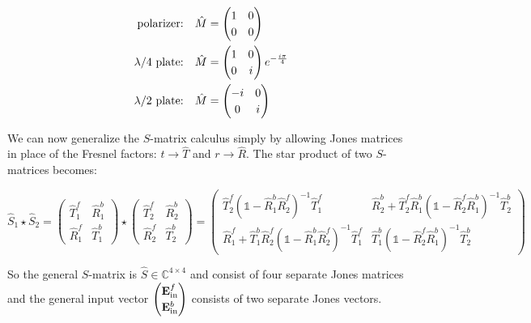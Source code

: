 \begin{equation}
\begin{split}
   \qq*{polarizer:} \hat{M} &=
   \begin{pmatrix}
       1 & 0\\
       0 & 0
   \end{pmatrix}\\
   \qq*{$\lambda / 4$ plate:} \hat{M} &=
   \begin{pmatrix}
       1 & 0\\
       0 & i
   \end{pmatrix}
   e^{-\frac{i \pi}{4}}\\
   \qq*{$\lambda / 2$ plate:} \hat{M} &=
   \begin{pmatrix}
       -i & 0\\
       0 & i
   \end{pmatrix}\\
\end{split}
\end{equation}

We can now generalize the $S$-matrix calculus simply by allowing Jones matrices in place of the Fresnel factors: $t \rightarrow \hat T$ and $r \rightarrow \hat R$. The star product of two $S$-matrices becomes:

\begin{equation}\label{eq:bg:star}
    \hat S_1 \star \hat S_2 =
    \begin{pmatrix}
        \hat T^f_1 & \hat R^b_1 \\
        \hat R^f_1 & \hat T^b_1
    \end{pmatrix}
    \star
    \begin{pmatrix}
        \hat T^f_2 & \hat R^b_2 \\
        \hat R^f_2 & \hat T^b_2
    \end{pmatrix}
    =
    \begin{pmatrix}
        \hat T^f_2 (\mathbb 1 - \hat R^b_1 \hat R^f_2)^{-1} \hat T^f_1 &
        \hat R^b_2 + \hat T^f_2 \hat R^b_1 (\mathbb 1 - \hat R^f_2 \hat R^b_1)^{-1} \hat T^b_2\\
        \hat R^f_1 + \hat T^b_1 \hat R^f_2 (\mathbb 1 - \hat R^b_1 \hat R^f_2)^{-1} \hat T^f_1 &
        \hat T^b_1 (\mathbb 1 - \hat R^f_2 \hat R^b_1)^{-1} \hat T^b_2
    \end{pmatrix}
\end{equation}

So the general $S$-matrix is $\hat S \in \mathbb C^{4 \times 4}$ and consist of four separate Jones matrices and the general input vector
$
\begingroup
\renewcommand*{\arraystretch}{1.2}
\begin{pmatrix}
    \vb E^f_\s{in} \\
    \vb E^b_\s{in}
\end{pmatrix}
\endgroup
$
consists of two separate Jones vectors.
